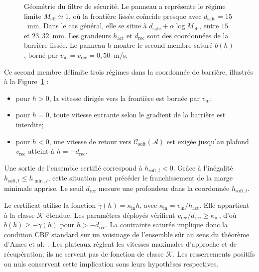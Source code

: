 \begin{figure}[htbp!]
{%
  }
  \caption[Géométrie de la fonction barrière et du second membre]{Géométrie du filtre de sécurité. Le panneau a représente le régime limite $M_{\mathrm{eff}}\simeq1$, où la frontière lissée coïncide presque avec $d_{\mathrm{safe}}=15$~mm. Dans le cas général, elle se situe à $d_{\mathrm{safe}}+\alpha\log M_{\mathrm{eff}}$, entre $15$ et $23{,}32$~mm. Les grandeurs $h_{\mathrm{act}}$ et $d_{\mathrm{rec}}$ sont des coordonnées de la barrière lissée. Le panneau b montre le second membre saturé $b(h)$, borné par $v_{\mathrm{in}}=v_{\mathrm{rec}}=0{,}50$~m/s.}
  \label{fig:cbf_geometrie}
\end{figure}

Ce second membre délimite trois régimes dans la coordonnée de barrière, illustrés à la Figure~\ref{fig:cbf_geometrie} :
\begin{itemize}
  \item pour $h>0$, la vitesse dirigée vers la frontière est bornée par $v_{\mathrm{in}}$;
  \item pour $h=0$, toute vitesse entrante selon le gradient de la barrière est interdite;
  \item pour $h<0$, une vitesse de retour vers $\mathcal{C}_{\mathrm{soft}}(\mathcal{A})$ est exigée jusqu'au plafond $v_{\mathrm{rec}}$ atteint à $h=-d_{\mathrm{rec}}$.
\end{itemize}
Une sortie de l'ensemble certifié correspond à $h_{\mathrm{soft},l}<0$. Grâce à l'inégalité $h_{\mathrm{soft},l}\leq h_{\min,l}$, cette situation peut précéder le franchissement de la marge minimale apprise. Le seuil $d_{\mathrm{rec}}$ mesure une profondeur dans la coordonnée $h_{\mathrm{soft},l}$.

Le certificat utilise la fonction $\widetilde{\gamma}(h)=\kappa_{\mathrm{in}}h$, avec $\kappa_{\mathrm{in}}=v_{\mathrm{in}}/h_{\mathrm{act}}$. Elle appartient à la classe $\mathcal{K}$ étendue. Les paramètres déployés vérifient $v_{\mathrm{rec}}/d_{\mathrm{rec}}\geq\kappa_{\mathrm{in}}$, d'où $b(h)\geq-\widetilde{\gamma}(h)$ pour $h>-d_{\mathrm{rec}}$. La contrainte saturée implique donc la condition \ac{CBF} standard sur un voisinage de l'ensemble sûr au sens du théorème d'Ames et al.~\cite{Ames2019Control}. Les plateaux règlent les vitesses maximales d'approche et de récupération; ils ne servent pas de fonction de classe $\mathcal{K}$. Les resserrements positifs ou nuls conservent cette implication sous leurs hypothèses respectives.


